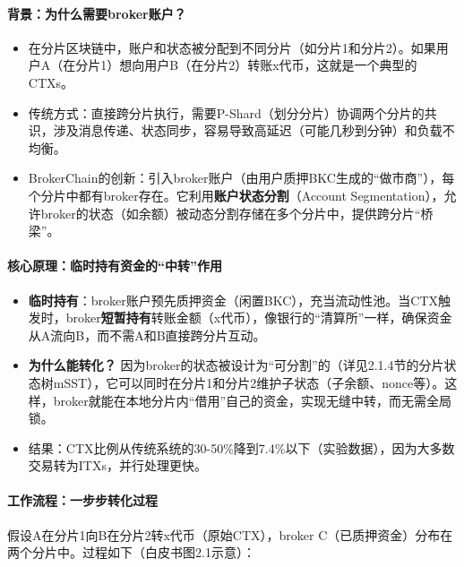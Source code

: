 \documentclass[a4paper,12pt]{ctexart}
\begin{document}
\paragraph{背景：为什么需要broker账户？}
\begin{itemize}
  \item 在分片区块链中，账户和状态被分配到不同分片（如分片1和分片2）。如果用户A（在分片1）想向用户B（在分片2）转账x代币，这就是一个典型的CTXs。
  \item 传统方式：直接跨分片执行，需要P-Shard（划分分片）协调两个分片的共识，涉及消息传递、状态同步，容易导致高延迟（可能几秒到分钟）和负载不均衡。
  \item BrokerChain的创新：引入broker账户（由用户质押BKC生成的“做市商”），每个分片中都有broker存在。它利用\textbf{账户状态分割}（Account Segmentation），允许broker的状态（如余额）被动态分割存储在多个分片中，提供跨分片“桥梁”。
\end{itemize}

\paragraph{核心原理：临时持有资金的“中转”作用}
\begin{itemize}
  \item \textbf{临时持有}：broker账户预先质押资金（闲置BKC），充当流动性池。当CTX触发时，broker\textbf{短暂持有}转账金额（x代币），像银行的“清算所”一样，确保资金从A流向B，而不需A和B直接跨分片互动。
  \item \textbf{为什么能转化？} 因为broker的状态被设计为“可分割”的（详见2.1.4节的分片状态树mSST），它可以同时在分片1和分片2维护子状态（子余额、nonce等）。这样，broker就能在本地分片内“借用”自己的资金，实现无缝中转，而无需全局锁。
  \item 结果：CTX比例从传统系统的30-50\%降到7.4\%以下（实验数据），因为大多数交易转为ITXs，并行处理更快。
\end{itemize}

\paragraph{工作流程：一步步转化过程}
假设A在分片1向B在分片2转x代币（原始CTX），broker C（已质押资金）分布在两个分片中。过程如下（白皮书图2.1示意）：
\end{document}
